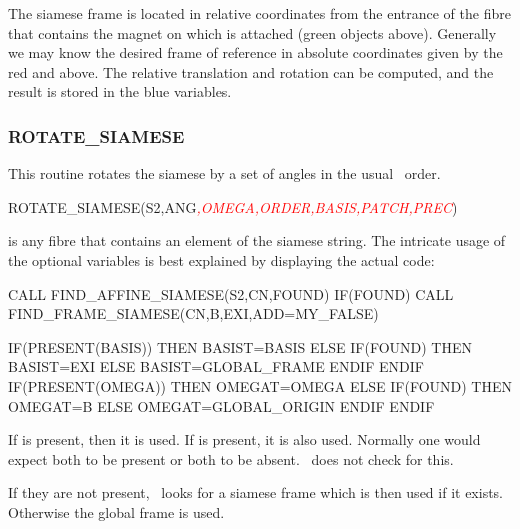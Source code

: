 
The siamese frame is located in relative coordinates from the entrance
of the fibre that contains the magnet on which  is
attached (green objects above). Generally we may know the desired
frame of reference in absolute coordinates given by the red 
and  above. The relative translation and rotation can be
computed, and the result is stored in the blue variables.


\subsubsection*{ROTATE_SIAMESE}

%
This routine rotates the siamese by a set of angles  in the
usual \PTC\ order.

\begin{ptccode}
ROTATE_SIAMESE(S2,ANG\textit{\textcolor{red}{,OMEGA,ORDER,BASIS,PATCH,PREC}})
\end{ptccode}

 is any fibre that contains an element of the siamese string. The
intricate usage of the optional variables  is
best explained by displaying the actual code:

\begin{ptccode}
CALL FIND_AFFINE_SIAMESE(S2,CN,FOUND)
IF(FOUND) CALL FIND_FRAME_SIAMESE(CN,B,EXI,ADD=MY_FALSE)

IF(PRESENT(BASIS)) THEN
  BASIST=BASIS
ELSE
  IF(FOUND) THEN
    BASIST=EXI
  ELSE
    BASIST=GLOBAL_FRAME
  ENDIF
ENDIF
IF(PRESENT(OMEGA)) THEN
  OMEGAT=OMEGA
ELSE
  IF(FOUND) THEN
    OMEGAT=B
  ELSE
    OMEGAT=GLOBAL_ORIGIN
  ENDIF
ENDIF
\end{ptccode}

If  is present, then it is used. If  is present, it is also
used. Normally one would expect both to be present or both to be absent.
\PTC\ does not check for this.

If they are not present, \PTC\ looks for a siamese frame which is then
used if it exists. Otherwise the global frame is used.

